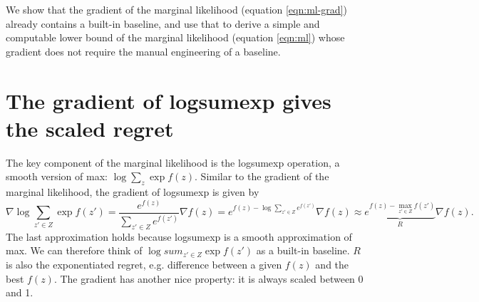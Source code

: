 \documentclass[12pt]{article}
\begin{document}
We show that the gradient of the marginal likelihood (equation \ref{eqn:ml-grad}) already contains
a built-in baseline, and use that to derive a simple and computable lower bound of the marginal likelihood
(equation \ref{eqn:ml}) whose gradient does not require the manual engineering of a baseline.

\section{The gradient of logsumexp gives the scaled regret}
The key component of the marginal likelihood is the logsumexp operation,
a smooth version of max: $\log \sum_z \exp f(z)$.
Similar to the gradient of the marginal likelihood,
the gradient of logsumexp is given by
$$
\nabla \log \sum_{z'\in Z} \exp f(z')
= \frac{e^{f(z)}}{\sum_{z' \in Z} e^{f(z')}} \nabla f(z)
= e^{f(z) - \log \sum_{z' \in Z} e^{f(z')}} \nabla f(z)
\approx \underbrace{e^{f(z) - \max_{z' \in Z} f(z')}}_{R} \nabla f(z).
$$
The last approximation holds because logsumexp is a smooth approximation of max.
We can therefore think of $\log sum_{z'\in Z}\exp f(z')$ as a built-in baseline.
$R$ is also the exponentiated regret, e.g. difference between a given $f(z)$
and the best $f(z)$.
The gradient has another nice property: it is always scaled between 0 and 1.
\end{document}
